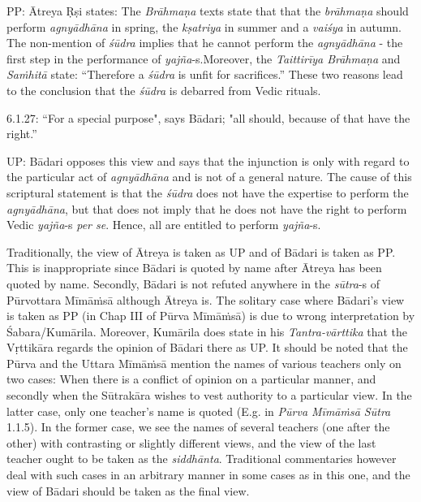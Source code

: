 PP: Ātreya Ṛṣi states: The \textit{Brāhmaṇa} texts state that that the \textit{brāhmaṇa} should perform \textit{agnyādhāna} in spring, the \textit{kṣatriya} in summer and a \textit{vaiśya} in autumn. The non-mention of \textit{śūdra} implies that he cannot perform the \textit{agnyādhāna} - the first step in the performance of \textit{yajña}-s.\break Moreover, the \textit{Taittirīya Brāhmaṇa} and \textit{Saṁhitā} state: “Therefore a \textit{śūdra} is unfit for sacrifices.” These two reasons lead to the conclusion that the \textit{śūdra} is debarred from Vedic rituals.

\vspace{.1cm}

6.1.27: “For a special purpose", says Bādari; "all should, because of that have the right.”

\vspace{.1cm}

UP: Bādari opposes this view and says that the injunction is only with regard to the particular act of \textit{agnyādhāna} and is not of a general nature. The cause of this scriptural statement is that the \textit{śūdra} does not have the expertise to perform the \textit{agnyādhāna}, but that does not imply that he does not have the right to perform Vedic \textit{yajña}-s \textit{per se}. Hence, all are entitled to perform \textit{yajña}-s.

\vspace{.1cm}

Traditionally, the view of Ātreya is taken as UP and of Bādari is taken as PP. This is inappropriate since Bādari is quoted by name after Ātreya has been quoted by name. Secondly, Bādari is not refuted anywhere in the \textit{sūtra}-s of Pūrvottara Mīmāṁsā although Ātreya is. The solitary case where Bādari’s view is taken as PP (in Chap III of Pūrva Mīmāṁsā) is due to wrong interpretation by Śabara/Kumārila. Moreover, Kumārila does state in his \textit{Tantra-vārttika} that the Vṛttikāra regards the opinion of Bādari there as UP. It should be noted that the Pūrva and the Uttara Mīmāṁsā mention the names of various teachers only on two cases: When there is a conflict of opinion on a particular manner, and secondly when the Sūtrakāra wishes to vest authority to a particular view. In the latter case, only one teacher’s name is quoted (E.g. in \textit{Pūrva Mīmāṁsā Sūtra} 1.1.5). In the former case, we see the names of several teachers (one after the other) with contrasting or slightly different views, and the view of the last teacher ought to be taken as the \textit{siddhānta}. Traditional commentaries however deal with such cases in an arbitrary manner in some cases as in this one, and the view of Bādari should be taken as the final view.

